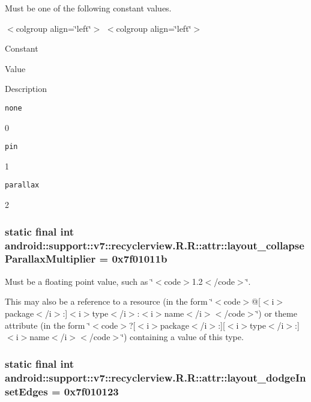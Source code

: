 Must be one of the following constant values. \begin{TabularC}{0}
\hline
\end{TabularC}
$<$colgroup align=\char`\"{}left\char`\"{}$>$ $<$colgroup align=\char`\"{}left\char`\"{}$>$ 

Constant

Value

Description 

{\tt none}

0

{\tt pin}

1

{\tt parallax}

2\hypertarget{classandroid_1_1support_1_1v7_1_1recyclerview_1_1_r_1_1attr_f6b160d6ee5d8a338d306ac28180ec4d}{
\subsubsection[{layout\_\-collapseParallaxMultiplier}]{\setlength{\rightskip}{0pt plus 5cm}static final int android::support::v7::recyclerview.R.R::attr::layout\_\-collapseParallaxMultiplier = 0x7f01011b}}
\label{classandroid_1_1support_1_1v7_1_1recyclerview_1_1_r_1_1attr_f6b160d6ee5d8a338d306ac28180ec4d}


Must be a floating point value, such as \char`\"{}$<$code$>$1.2$<$/code$>$\char`\"{}. 

This may also be a reference to a resource (in the form \char`\"{}$<$code$>$@\mbox{[}$<$i$>$package$<$/i$>$:\mbox{]}$<$i$>$type$<$/i$>$:$<$i$>$name$<$/i$>$$<$/code$>$\char`\"{}) or theme attribute (in the form \char`\"{}$<$code$>$?\mbox{[}$<$i$>$package$<$/i$>$:\mbox{]}\mbox{[}$<$i$>$type$<$/i$>$:\mbox{]}$<$i$>$name$<$/i$>$$<$/code$>$\char`\"{}) containing a value of this type. \hypertarget{classandroid_1_1support_1_1v7_1_1recyclerview_1_1_r_1_1attr_6144da827e29d16fb524c418e4fee782}{
\subsubsection[{layout\_\-dodgeInsetEdges}]{\setlength{\rightskip}{0pt plus 5cm}static final int android::support::v7::recyclerview.R.R::attr::layout\_\-dodgeInsetEdges = 0x7f010123}}
\label{classandroid_1_1support_1_1v7_1_1recyclerview_1_1_r_1_1attr_6144da827e29d16fb524c418e4fee782}


